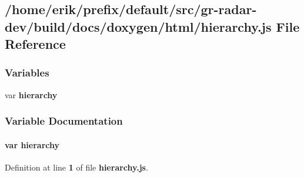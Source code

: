 \subsection{/home/erik/prefix/default/src/gr-\/radar-\/dev/build/docs/doxygen/html/hierarchy.js File Reference}
\label{hierarchy_8js}
\subsubsection*{Variables}
\begin{DoxyCompactItemize}
\item 
var {\bf hierarchy}
\end{DoxyCompactItemize}


\subsubsection{Variable Documentation}
\paragraph[{hierarchy}]{\setlength{\rightskip}{0pt plus 5cm}var hierarchy}\label{hierarchy_8js_ad9447ad30669c42ccb861cbe36a18f6b}


Definition at line {\bf 1} of file {\bf hierarchy.\+js}.

